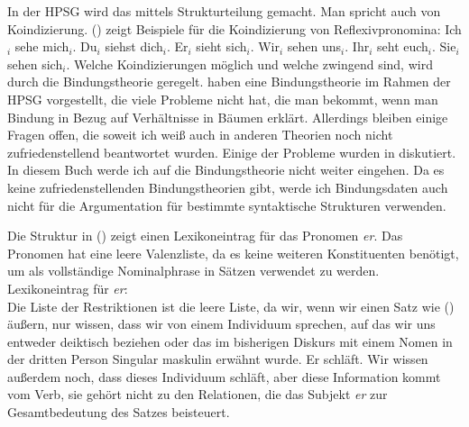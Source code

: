 In der HPSG wird das mittels Strukturteilung gemacht. Man spricht auch von Koindizierung.
() zeigt Beispiele für die Koindizierung von Reflexivpronomina:
\eal
\ex Ich$_i$ sehe mich$_i$.
\ex Du$_i$ siehst dich$_i$.
\ex Er$_i$ sieht sich$_i$.
\ex Wir$_i$ sehen uns$_i$.
\ex Ihr$_i$ seht euch$_i$.
\ex Sie$_i$ sehen sich$_i$.
\zl
Welche Koindizierungen möglich und welche zwingend sind, wird durch die Bindungstheorie
geregelt. \citet{PS92a,ps2} haben eine Bindungstheorie im Rahmen der HPSG vorgestellt, die viele Probleme
nicht hat, die man bekommt, wenn man Bindung in Bezug auf Verhältnisse in Bäumen erklärt. Allerdings bleiben
einige Fragen offen, die soweit ich weiß auch in anderen Theorien noch nicht zufriedenstellend beantwortet
wurden. Einige der Probleme wurden in  diskutiert. In diesem Buch werde
ich auf die Bindungstheorie nicht weiter eingehen. Da es keine zufriedenstellenden Bindungstheorien gibt,
werde ich Bindungsdaten auch nicht für die Argumentation für bestimmte syntaktische Strukturen verwenden.

Die Struktur in () zeigt einen Lexikoneintrag für das Pronomen \emph{er}. Das Pronomen hat eine
leere Valenzliste, da es keine weiteren Konstituenten benötigt, um als vollständige Nominalphrase in Sätzen
verwendet zu werden.
\ea
Lexikoneintrag für \emph{er}:\\
\z
Die Liste der Restriktionen ist die leere Liste, da wir, wenn wir einen Satz wie () äußern, nur
wissen, dass wir von einem Individuum sprechen, auf das wir uns entweder deiktisch beziehen oder das
im bisherigen Diskurs mit einem Nomen in der dritten Person Singular maskulin erwähnt wurde.
\ea
Er schläft.
\z
Wir wissen außerdem noch, dass dieses Individuum schläft, aber diese Information kommt vom Verb, sie
gehört nicht zu den Relationen, die das Subjekt \emph{er} zur Gesamtbedeutung des Satzes beisteuert.


